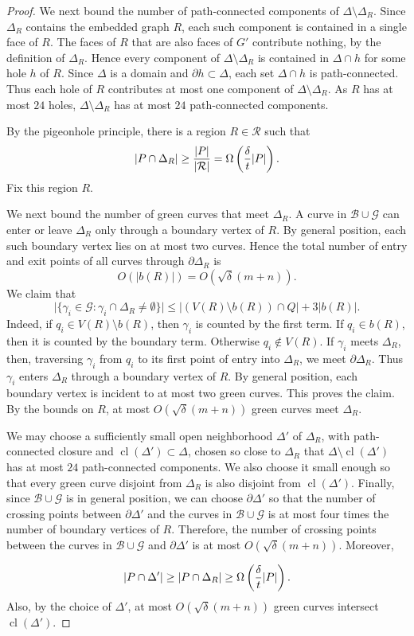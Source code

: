 \documentclass[10pt,a4paper]{amsart}
\begin{document}
\begin{proof}
We next bound the number of path-connected components of
\(\Delta\setminus\Delta_R\). Since \(\Delta_R\) contains the embedded graph
\(R\), each such component is contained in a single face of \(R\). The faces
of \(R\) that are also faces of \(G'\) contribute nothing, by the definition of
\(\Delta_R\). Hence every component of \(\Delta\setminus\Delta_R\) is contained
in \(\Delta\cap h\) for some hole \(h\) of \(R\). Since \(\Delta\) is a domain
and \(\partial h\subset\Delta\), each set \(\Delta\cap h\) is path-connected.
Thus each hole of \(R\) contributes at most one component of
\(\Delta\setminus\Delta_R\). As \(R\) has at most \(24\) holes,
\(\Delta\setminus\Delta_R\) has at most \(24\) path-connected components.




By the pigeonhole principle, there is a region \(R\in\mathcal R\) such that
\[
|P\cap\Delta_R|
\ge { |P| \over |\mathcal R|}
=
\Omega\left({\delta\over t}|P|\right).
\]
Fix this region \(R\).

We next bound the number of green curves that meet \(\Delta_R\). A curve in
\(\mathcal B\cup\mathcal G\) can enter or leave \(\Delta_R\) only through a
boundary vertex of \(R\). By general position, each such boundary vertex lies
on at most two curves. Hence the total number of entry and exit points of all
curves through \(\partial\Delta_R\) is
\[
O(|b(R)|)=O(\sqrt\delta(m+n)).
\]
We claim that
\[
\bigl|\{\gamma_i\in\mathcal G:\gamma_i\cap\Delta_R\ne\emptyset\}\bigr|
\le |(V(R)\setminus b(R))\cap Q|+3|b(R)|.
\]
Indeed, if \(q_i\in V(R)\setminus b(R)\), then \(\gamma_i\) is counted by the
first term. If \(q_i\in b(R)\), then it is counted by the boundary term.
Otherwise \(q_i\notin V(R)\). If \(\gamma_i\) meets \(\Delta_R\), then,
traversing \(\gamma_i\) from \(q_i\) to its first point of entry into
\(\Delta_R\), we meet \(\partial\Delta_R\). Thus \(\gamma_i\) enters
\(\Delta_R\) through a boundary vertex of \(R\). By general position, each
boundary vertex is incident to at most two green curves. This proves the
claim.  By the bounds on \(R\), at most $O(\sqrt\delta(m+n))$ green curves meet \(\Delta_R\).

We may choose a sufficiently small open neighborhood \(\Delta'\) of
\(\Delta_R\), with path-connected closure and
\(\operatorname{cl}(\Delta')\subset\Delta\), chosen so close to \(\Delta_R\)
that \(\Delta\setminus\operatorname{cl}(\Delta')\) has at most \(24\)
path-connected components.  We also choose it small enough so that every green curve
disjoint from \(\Delta_R\) is also disjoint from \(\operatorname{cl}(\Delta')\).
Finally, since $\mathcal B\cup \mathcal G$ is in general position, we can choose \(\partial\Delta'\) so that the number of crossing points
between \(\partial\Delta'\) and the curves in $\mathcal B\cup \mathcal G$ is at most four times the
number of boundary vertices of \(R\). Therefore, the number of crossing points between the curves in $\mathcal B\cup\mathcal G$ and $\partial\Delta'$ is at most $O(\sqrt\delta(m+n))$.  Moreover, 

\[
|P\cap\Delta'|
\ge |P\cap\Delta_R|
\ge \Omega\left({\delta\over t}|P|\right).
\]
Also, by the choice of \(\Delta'\), at most \(O(\sqrt\delta(m+n))\) green
curves intersect \(\operatorname{cl}(\Delta')\).

\end{proof}
\end{document}
